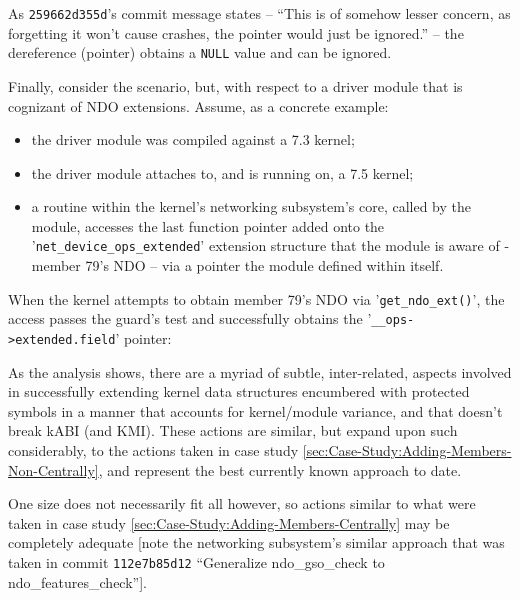 \documentclass[10pt,oneside,english]{book}
\begin{document}
As \texttt{259662d355d}'s commit message states -- ``This is of
somehow lesser concern, as forgetting it won't cause crashes, the
pointer would just be ignored.'' -- the dereference (pointer) obtains
a \texttt{NULL} value and can be ignored.

Finally, consider the scenario, but, with respect to a driver module
that is cognizant of NDO extensions. Assume, as a concrete example:
\begin{itemize}
\item the driver module was compiled against a 7.3 kernel;
\item the driver module attaches to, and is running on, a 7.5 kernel;
\item a routine within the kernel's networking subsystem's core, called
by the module, accesses the last function pointer added onto the '\texttt{net\_device\_ops\_extended}'
extension structure that the module is aware of - member 79's NDO
-- via a pointer the module defined within itself.
\end{itemize}
When the kernel attempts to obtain member 79's NDO via '\texttt{get\_ndo\_ext()}',
the access passes the guard's test and successfully obtains the '\texttt{\_\_ops->extended.field}'
pointer:


As the analysis shows, there are a myriad of subtle, inter-related,
aspects involved in successfully extending kernel data structures
encumbered with protected symbols in a manner that accounts for kernel/module
variance, and that doesn't break kABI (and KMI). These actions are
similar, but expand upon such considerably, to the actions taken in
case study \ref{sec:Case-Study:Adding-Members-Non-Centrally}, and
represent the best currently known approach to date.

One size does not necessarily fit all however, so actions similar
to what were taken in case study \ref{sec:Case-Study:Adding-Members-Centrally}
may be completely adequate {[}note the networking subsystem's similar
approach that was taken in commit \texttt{112e7b85d12} ``Generalize
ndo\_gso\_check to ndo\_features\_check''{]}.
\end{document}
